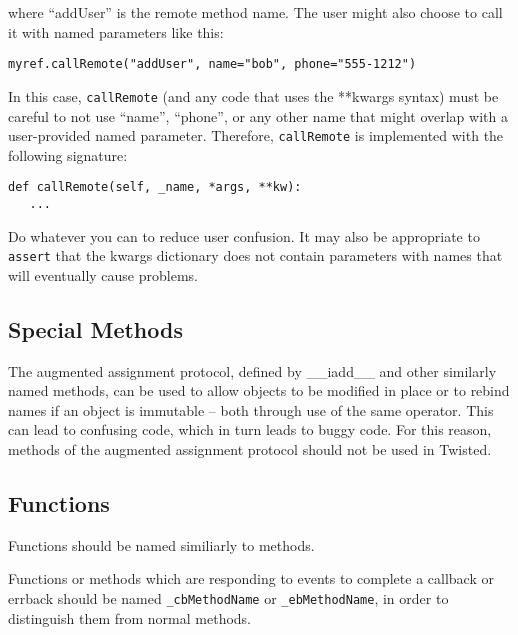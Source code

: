 where ``addUser'' is the remote method name. The user might also     choose to call it with named parameters like this:\begin{verbatim}
myref.callRemote("addUser", name="bob", phone="555-1212")
\end{verbatim}


In this case, \texttt{call\linebreak[1]Remote} (and any code that uses the     **kwargs syntax) must be careful to not use ``name'', ``phone'', or     any other name that might overlap with a user-provided named parameter.     Therefore, \texttt{call\linebreak[1]Remote} is implemented with the following     signature:\begin{verbatim}
def callRemote(self, _name, *args, **kw):
   ...
\end{verbatim}


Do whatever you can to reduce user confusion. It may also be     appropriate to \texttt{assert} that the kwargs     dictionary does not contain parameters with names that will eventually     cause problems.

\subsection{Special Methods}


The augmented assignment protocol, defined by \_\_iadd\_\_ and other     similarly named methods, can be used to allow objects to be modified in     place or to rebind names if an object is immutable -- both through use     of the same operator.  This can lead to confusing code, which in turn     leads to buggy code.  For this reason, methods of the augmented     assignment protocol should not be used in Twisted.

\subsection{Functions}


Functions should be named similiarly to methods.

Functions or methods which are responding to events to     complete a callback or errback should be named \texttt{\_cb\linebreak[1]Method\linebreak[1]Name} or     \texttt{\_eb\linebreak[1]Method\linebreak[1]Name}, in order to distinguish them from normal     methods.

